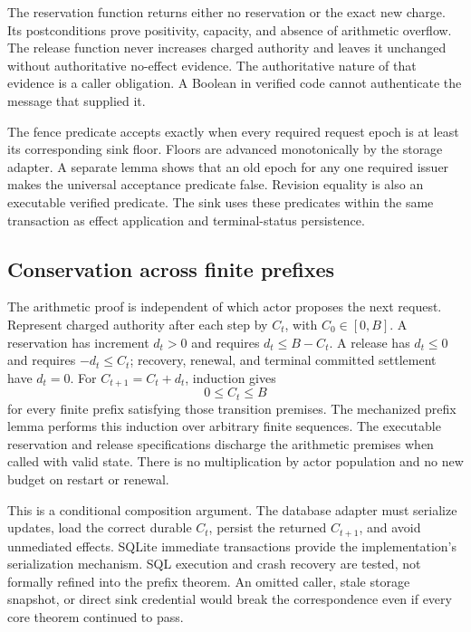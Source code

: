 The reservation function returns either no reservation or the exact new charge.
Its postconditions prove positivity, capacity, and absence of arithmetic
overflow. The release function never increases charged authority and leaves it
unchanged without authoritative no-effect evidence. The authoritative nature of
that evidence is a caller obligation. A Boolean in verified code cannot
authenticate the message that supplied it.

The fence predicate accepts exactly when every required request epoch is at
least its corresponding sink floor. Floors are advanced monotonically by the
storage adapter. A separate lemma shows that an old epoch for any one required
issuer makes the universal acceptance predicate false. Revision equality is
also an executable verified predicate. The sink uses these predicates within
the same transaction as effect application and terminal-status persistence.

\subsection{Conservation across finite prefixes}
The arithmetic proof is independent of which actor proposes the next request.
Represent charged authority after each step by $C_t$, with $C_0\in[0,B]$.
A reservation has increment $d_t>0$ and requires $d_t\le B-C_t$.
A release has $d_t\le0$ and requires $-d_t\le C_t$; recovery,
renewal, and terminal committed settlement have $d_t=0$.
For $C_{t+1}=C_t+d_t$, induction gives
\begin{equation}
                 0\le C_t\le B
\label{eq:v2conservation}
\end{equation}
for every finite prefix satisfying those transition premises. The mechanized
prefix lemma performs this induction over arbitrary finite sequences. The
executable reservation and release specifications discharge the arithmetic
premises when called with valid state. There is no multiplication by actor
population and no new budget on restart or renewal.

This is a conditional composition argument. The database adapter must serialize
updates, load the correct durable $C_t$, persist the returned $C_{t+1}$, and avoid
unmediated effects. SQLite immediate transactions provide the implementation's
serialization mechanism. SQL execution and crash recovery are tested, not
formally refined into the prefix theorem. An omitted caller, stale storage
snapshot, or direct sink credential would break the correspondence even if
every core theorem continued to pass.

